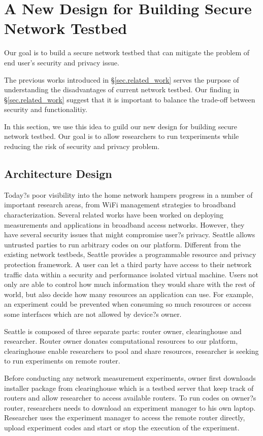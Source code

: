 \section{A New Design for Building Secure Network Testbed}
\label{sec.design}
Our goal is to build a secure network testbed that can mitigate the problem of end user's security and privacy issue. 

The previous works introduced in \S{\ref{sec.related_work}} serves the purpose of understanding the disadvantages of current network testbed. Our finding in \S{\ref{sec.related_work}} suggest that it is important to balance the trade-off between security and functionalitiy.

In this section, we use this idea to guild our new design for building secure network testbed. Our goal is to allow researchers to run texperiments while reducing the risk of security and privacy problem.

\subsection{Architecture Design}
Today?s poor visibility into the home network hampers progress in a number of important research areas, from WiFi management strategies to broadband characterization. Several related works have been worked on deploying measurements and applications in broadband access networks. However, they have several security issues that might compromise user?s privacy. Seattle allows untrusted parties to run arbitrary codes on our platform. Different from the existing network testbeds, Seattle provides a programmable resource and privacy protection framework. A user can let a third party have access to their network traffic data within a security and performance isolated virtual machine. Users not only are able to control how much information they would share with the rest of world, but also decide how many resources an application can use. For example, an experiment could be prevented when consuming so much resources or access some interfaces which are not allowed by device?s owner. 

Seattle is composed of three separate parts: router owner, clearinghouse and researcher. Router owner donates computational resources to our platform, clearinghouse enable researchers to pool and share resources, researcher is seeking to run experiments on remote router.

Before conducting any network measurement experiments, owner first downloads installer package from clearinghouse which is a testbed server that keep track of routers and allow researcher to access available routers. To run codes on owner?s router, researchers needs to download an experiment manager to his own laptop. Researcher uses the experiment manager to access the remote router directly, upload experiment codes and start or stop the execution of the experiment.

